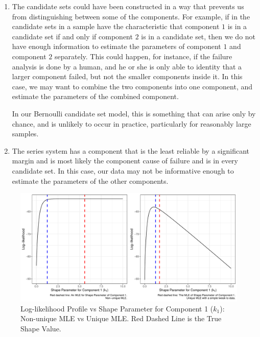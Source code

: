 \documentclass[
]{article}
\begin{document}
\begin{enumerate}
\def\labelenumi{\arabic{enumi}.}
\item
  The candidate sets could have been constructed in a way that prevents
  us from distinguishing between some of the components. For example, if
  in the candidate sets in a sample have the characteristic that
  component \(1\) is in a candidate set if and only if component \(2\)
  is in a candidate set, then we do not have enough information to
  estimate the parameters of component \(1\) and component \(2\)
  separately. This could happen, for instance, if the failure analysis
  is done by a human, and he or she is only able to identity that a
  larger component failed, but not the smaller components inside it. In
  this case, we may want to combine the two components into one
  component, and estimate the parameters of the combined component.

  In our Bernoulli candidate set model, this is something that can arise
  only by chance, and is unlikely to occur in practice, particularly for
  reasonably large samples.
\item
  The series system has a component that is the least reliable by a
  significant margin and is most likely the component cause of failure
  and is in every candidate set. In this case, our data may not be
  informative enough to estimate the parameters of the other components.
\end{enumerate}

\begin{figure}

{\centering \includegraphics{image/fail-test-flat-likelihood} 

}

\caption{Log-likelihood Profile vs Shape Parameter for Component 1 ($k_1$): Non-unique MLE vs Unique MLE.
Red Dashed Line is the True Shape Value.}\label{fig:flat-loglike-prof}
\end{figure}
\end{document}

